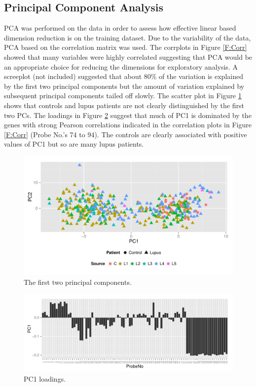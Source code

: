 \documentclass[a4paper, 12pt]{report}
\begin{document}
\subsection*{Principal Component Analysis}
\gls{PCA} was performed on the data in order to assess how effective linear based dimension reduction is on the training dataset. Due to the variability of the data, PCA based on the correlation matrix was used. The corrplots in Figure \ref{F:Corr} showed that many variables were highly correlated suggesting that PCA would be an appropriate choice for reducing the dimensions for exploratory analysis. A screeplot (not included) suggested that about 80\% of the variation is explained by the first two principal components but the amount of variation explained by subsequent principal components tailed off slowly. The scatter plot in Figure \ref{F:PCA} shows that controls and lupus patients are not clearly distinguished by the first two PCs. The loadings in Figure \ref{F:PCALoadings} suggest that much of PC1 is dominated by the genes with strong Pearson correlations indicated in the correlation plots in Figure \ref{F:Corr} (Probe No.'s 74 to 94). The controls are clearly associated with positive values of PC1 but so are many lupus patients. %

\begin{figure}[H]
\begin{centering}
\includegraphics[width=\textwidth]{pc12.pdf} 
\caption{The first two principal components.} 
 \label{F:PCA}
\end{centering}
\end{figure}

\begin{figure}[H]
\begin{centering}
\includegraphics[width=\textwidth]{loadings.pdf} 
\caption{PC1 loadings.} 
 \label{F:PCALoadings}
\end{centering}
\end{figure}
\end{document}
